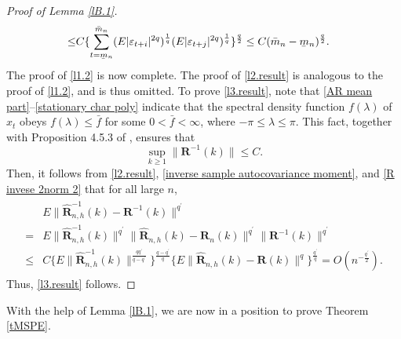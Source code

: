 \documentclass[ejsv2]{imsart}
\newcommand{\ubar}[1]{\underaccent{\bar}{#1}}
\theoremstyle{plain}
\theoremstyle{definition}
\theoremstyle{remark}
\begin{document}
\begin{proof}[Proof of Lemma \ref{lB.1}]
{\begin{equation}
\begin{split}
     \leq& C\{\sum_{t=\ubar{m}_{n}}^{\bar{m}_{n}}(E|\varepsilon_{t+i}|^{2q})^{\frac{1}{q}}(E|\varepsilon_{t+j}|^{2q})^{\frac{1}{q}}\}^{\frac{q}{2}}\leq C(\bar{m}_{n}-\ubar{m}_{n})^{\frac{q}{2}}.
\end{split}
\end{equation}
The proof of \eqref{l1.2} is now complete. The proof of \eqref{l2.result} is analogous to the proof of \eqref{l1.2}, and is thus omitted. To prove \eqref{l3.result}, note that 
\eqref{AR mean part}--\eqref{stationary char poly} indicate that the spectral density function $f(\lambda)$ of $x_t$ obeys $f(\lambda)\leq \bar{f}$ for some $0<\bar{f}<\infty$, where $-\pi\leq\lambda\leq\pi$. This fact, together with Proposition 4.5.3 of \cite{Brockwell1991}, ensures that 
\begin{equation}\label{R invese 2norm 2}
\sup\limits_{k\geq1}\lVert\mathbf{R}^{-1}(k)\rVert\leq C.
\end{equation}
Then, it follows from \eqref{l2.result}, \eqref{inverse sample autocovariance moment}, and \eqref{R invese 2norm 2} that for all large $n$,
\begin{align}\label{pl3.1}
\begin{split}
   &E\lVert\hat{\mathbf{R}}^{-1}_{n,h}(k)-\mathbf{R}^{-1}(k)\rVert^{q^\prime} \\
    = &   E\lVert\hat{\mathbf{R}}^{-1}_{n,h}(k)\rVert^{q^\prime}\lVert\hat{\mathbf{R}}_{n,h}(k)-\mathbf{R}_n(k)\rVert^{q^\prime}\lVert\mathbf{R}^{-1}(k)\rVert^{q^\prime}\\
    \leq& C\{E\lVert\hat{\mathbf{R}}^{-1}_{n,h}(k)\rVert^{\frac{qq^\prime}{q-q^\prime}}\}^{\frac{q-q^\prime}{q}}\{E\lVert\hat{\mathbf{R}}_{n,h}(k)-\mathbf{R}(k)\rVert^{q}\}^{\frac{q^\prime}{q}}=O(n^{-\frac{q^\prime}{2}}).
\end{split}
\end{align}
Thus, \eqref{l3.result} follows.}
\end{proof}

With the help of Lemma \ref{lB.1}, we are now in a position to prove Theorem \ref{tMSPE}.
\end{document}
